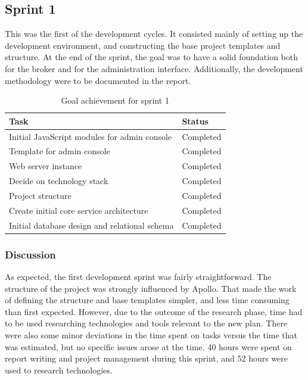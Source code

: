 \subsection{Sprint 1}
\label{subsec:project_lifecycle-development-sprint_1}

This was the first of the development cycles. It consisted mainly of setting up the development environment, and constructing the base project templates and structure. At the end of the sprint, the goal was to have a solid foundation both for the broker and for the administration interface. Additionally, the development methodology were to be documented in the report.

\begin{center}
\begin{table}[H]
\small
\centering
\begin{tabular}{|p{10cm}|p{2cm}|}
\hline
\rowcolor{lightgray}
 \textbf{Task} & \textbf{Status} \\
\hline
\rowcolor{green!30}
 Initial JavaScript modules for admin console & Completed  \\
 \rowcolor{green!30}
 Template for admin console & Completed \\ 
 \rowcolor{green!30}
 Web server instance & Completed \\ 
 \rowcolor{green!30}
 Decide on technology stack & Completed \\ 
 \rowcolor{green!30}
 Project structure & Completed \\
 \rowcolor{green!30}
 Create initial core service architecture & Completed \\
 \rowcolor{green!30}
 Initial database design and relational schema & Completed \\
\hline
\end{tabular}
\caption{Goal achievement for sprint 1}
\label{tab:sprint 1, goals}
\end{table}
\end{center}


\subsubsection{Discussion}
\label{subsec:project_lifecycle-development-sprint_1-discussion}

As expected, the first development sprint was fairly straightforward. The structure of the project was strongly influenced by Apollo. That made the work of defining the structure and base templates simpler, and less time consuming than first expected. However, due to the outcome of the research phase, time had to be used researching technologies and tools relevant to the new plan. There were also some minor deviations in the time spent on tasks versus the time that was estimated, but no specific issues arose at the time. 40 hours were spent on report writing and project management during this sprint, and 52 hours were used to research technologies.

